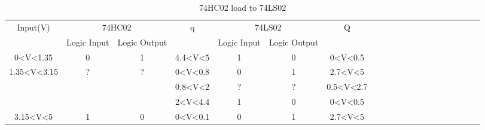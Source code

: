 	\begin{center}
	\hspace{2cm}\begin{table}[h!]
	\begin{tabular}{llllllllllllllllllll} 
	\cline{1-7}
	\multicolumn{1}{|c|}{\multirow{2}{*}{Input(V)}}                                & \multicolumn{2}{c|}{74HC02}                                                       & \multicolumn{1}{c|}{\multirow{2}{*}{q}}          & \multicolumn{2}{c|}{74LS02}                                          & \multicolumn{1}{c|}{\multirow{2}{*}{Q}}             \\ \cline{2-3} \cline{5-6}
	\multicolumn{1}{|c|}{}                                                 & \multicolumn{1}{c|}{Logic Input}        & \multicolumn{1}{c|}{Logic Output}       & \multicolumn{1}{c|}{}                            & \multicolumn{1}{c|}{Logic Input} & \multicolumn{1}{c|}{Logic Output} & \multicolumn{1}{c|}{}                               \\ \cline{1-7}
	\multicolumn{1}{|c|}{0\textless{}V\textless{}1.35}                     & \multicolumn{1}{c|}{0}                  & \multicolumn{1}{c|}{1}                  & \multicolumn{1}{c|}{4.4\textless{}V\textless{}5} & \multicolumn{1}{c|}{1}           & \multicolumn{1}{c|}{0}            & \multicolumn{1}{c|}{0\textless{}V\textless{}0.5}    \\ \cline{1-7}
	\multicolumn{1}{|c|}{\multirow{3}{*}{1.35\textless{}V\textless{}3.15}} & \multicolumn{1}{c|}{\multirow{3}{*}{?}} & \multicolumn{1}{c|}{\multirow{3}{*}{?}} & \multicolumn{1}{c|}{0\textless{}V\textless{}0.8} & \multicolumn{1}{c|}{0}           & \multicolumn{1}{c|}{1}            & \multicolumn{1}{c|}{2.7\textless{}V\textless{}5}    \\ \cline{4-7}
	\multicolumn{1}{|c|}{}                                                 & \multicolumn{1}{c|}{}                   & \multicolumn{1}{c|}{}                   & \multicolumn{1}{c|}{0.8\textless{}V\textless{}2} & \multicolumn{1}{c|}{?}           & \multicolumn{1}{c|}{?}            & \multicolumn{1}{c|}{0.5\textless{}V\textless{}2.7}  \\ \cline{4-7}
	\multicolumn{1}{|c|}{}                                                 & \multicolumn{1}{c|}{}                   & \multicolumn{1}{c|}{}                   & \multicolumn{1}{c|}{2\textless{}V\textless{}4.4} & \multicolumn{1}{c|}{1}           & \multicolumn{1}{c|}{0}            & \multicolumn{1}{c|}{0\textless{}V\textless{}0.5}    \\ \cline{1-7}
	\multicolumn{1}{|c|}{3.15\textless{}V\textless{}5}                     & \multicolumn{1}{c|}{1}                  & \multicolumn{1}{c|}{0}                  & \multicolumn{1}{c|}{0\textless{}V\textless{}0.1} & \multicolumn{1}{c|}{0}           & \multicolumn{1}{c|}{1}            & \multicolumn{1}{c|}{2.7\textless{}V\textless{}5}\\ \cline{1-7}
	\end{tabular}
	\caption{\color{cyan}74HC02 load to 74LS02}
	\label{fig:ej2thhctols}
	\end{table}
	\end{center}
	
